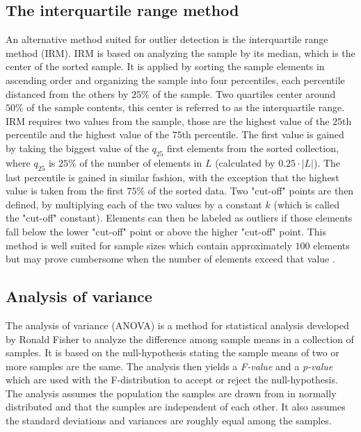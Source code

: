 \subsection{The interquartile range method}
An alternative method suited for outlier detection is the interquartile range method (IRM). IRM is based on analyzing the sample by its median, which is the center of the sorted sample. It is applied by sorting the sample elements in ascending order and organizing the sample into four percentiles, each percentile distanced from the others by $25\%$ of the sample.  Two quartiles center around $50\%$ of the sample contents, this center is referred to as the interquartile range. IRM requires two values from the sample, those are the highest value of the $25$th percentile and the highest value of the $75$th percentile. The first value is gained by taking the biggest value of the $q_{25}$ first elements from the sorted collection, where $q_{25}$ is $25\%$ of the number of elements in $L$ (calculated by $0.25 \cdot |L|$). The last percentile is gained in similar fashion, with the exception that the highest value is taken from the first $75\%$ of the sorted data. Two "cut-off" points are then defined, by multiplying each of the two values by a constant $k$ (which is called the "cut-off" constant). Elements can then be labeled as outliers if those elements fall below the lower "cut-off" point or above the higher "cut-off" point. This method is well suited for sample sizes which contain approximately $100$ elements but may prove cumbersome when the number of elements exceed that value \cite{vinutha2018detection, walfish2006review, dovoedo2015boxplot}.


\subsection{Analysis of variance}

The analysis of variance (ANOVA) is a method for statistical analysis developed by Ronald Fisher to analyze the difference among sample means in a collection of samples. It is based on the null-hypothesis stating the sample means of two or more samples are the same. The analysis then yields a \textit{F-value} and a \textit{p-value} which are used with the F-distribution to accept or reject the null-hypothesis. The analysis assumes the population the samples are drawn from in normally distributed and that the samples are independent of each other. It also assumes the standard deviations and variances are roughly equal among the samples.

